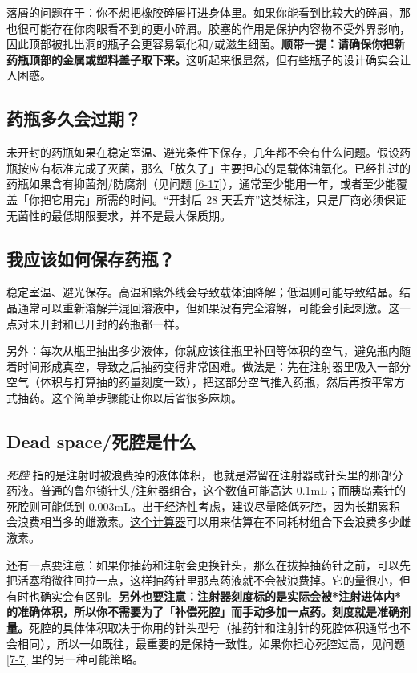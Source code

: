 \documentclass{article}
\begin{document}
落屑的问题在于：你不想把橡胶碎屑打进身体里。如果你能看到比较大的碎屑，那也很可能存在你肉眼看不到的更小碎屑。胶塞的作用是保护内容物不受外界影响，因此顶部被扎出洞的瓶子会更容易氧化和/或滋生细菌。\textbf{顺带一提：请确保你把新药瓶顶部的金属或塑料盖子取下来。}这听起来很显然，但有些瓶子的设计确实会让人困惑。

\subsection{药瓶多久会过期？}

未开封的药瓶如果在稳定室温、避光条件下保存，几年都不会有什么问题。假设药瓶按应有标准完成了灭菌，那么「放久了」主要担心的是载体油氧化。已经扎过的药瓶如果含有抑菌剂/防腐剂（见问题 \ref{6-17}），通常至少能用一年，或者至少能覆盖「你把它用完」所需的时间。“开封后 28 天丢弃”这类标注，只是厂商必须保证无菌性的最低期限要求，并不是最大保质期。

\subsection{我应该如何保存药瓶？}\label{5-25}

稳定室温、避光保存。高温和紫外线会导致载体油降解；低温则可能导致结晶。结晶通常可以重新溶解并混回溶液中，但如果没有完全溶解，可能会引起刺激。这一点对未开封和已开封的药瓶都一样。

另外：每次从瓶里抽出多少液体，你就应该往瓶里补回等体积的空气，避免瓶内随着时间形成真空，导致之后抽药变得非常困难。做法是：先在注射器里吸入一部分空气（体积与打算抽的药量刻度一致），把这部分空气推入药瓶，然后再按平常方式抽药。这个简单步骤能让你以后省很多麻烦。

\subsection{Dead space/死腔是什么}\label{5-26}

\textit{死腔} 指的是注射时被浪费掉的液体体积，也就是滞留在注射器或针头里的那部分药液。普通的鲁尔锁针头/注射器组合，这个数值可能高达 0.1mL；而胰岛素针的死腔则可能低到 0.003mL。出于经济性考虑，建议尽量降低死腔，因为长期累积会浪费相当多的雌激素。\href{https://hrtcafe.net/Calc/}{这个计算器}可以用来估算在不同耗材组合下会浪费多少雌激素。

还有一点要注意：如果你抽药和注射会更换针头，那么在拔掉抽药针之前，可以先把活塞稍微往回拉一点，这样抽药针里那点药液就不会被浪费掉。它的量很小，但有时也确实会有区别。\textbf{另外也要注意：注射器刻度标的是实际会被*注射进体内*的准确体积，所以你不需要为了「补偿死腔」而手动多加一点药。刻度就是准确剂量。}死腔的具体体积取决于你用的针头型号（抽药针和注射针的死腔体积通常也不会相同），所以一如既往，最重要的是保持一致性。如果你担心死腔过高，见问题 \ref{7-7} 里的另一种可能策略。
\end{document}
